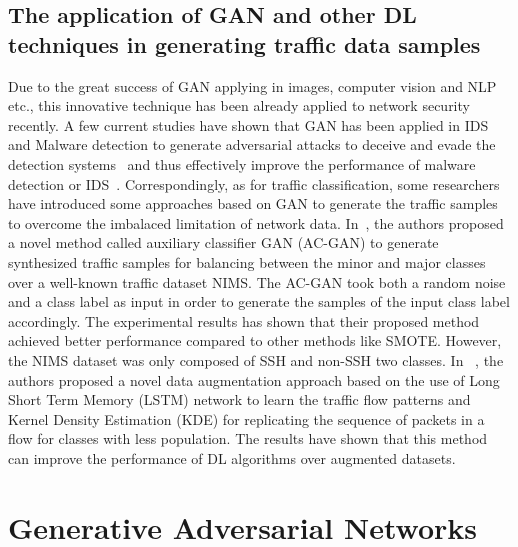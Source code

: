 \documentclass[conference]{IEEEtran}
\begin{document}
\subsection{The application of GAN and other DL techniques in generating traffic data samples}
Due to the great success of GAN applying in images, computer vision and NLP etc., this innovative technique has been already applied to network security recently. A few current studies have shown that GAN has been applied in IDS and Malware detection to generate adversarial attacks to deceive and evade the detection systems~\cite{Lin2018IDSGANGA,Hu2017GAN} and thus effectively improve the performance of malware detection or IDS~\cite{Hu2017GAN,KimGAN,Lin2018IDSGANGA,Salem2018GAN,Knife-Fight}. Correspondingly, as for traffic classification, some researchers have introduced some approaches based on GAN to generate the traffic samples to overcome the imbalaced limitation of network data. In~\cite{Vu-GAN}, the authors proposed a novel method called auxiliary classifier GAN (AC-GAN) to generate synthesized traffic samples for balancing between the minor and major classes over a well-known traffic dataset NIMS. The AC-GAN took both a random noise and a class label as input in order to generate the samples of the input class label accordingly. The experimental results has shown that their proposed method achieved better performance compared to other methods like SMOTE. However, the NIMS dataset was only composed of  SSH and non-SSH two classes. In ~\cite{Hasibi2019AugmentationSF}, the authors proposed a novel data augmentation approach based on the use of Long Short Term Memory (LSTM) network to learn the traffic flow patterns and Kernel Density Estimation (KDE) for replicating the sequence of packets in a flow for classes with less population. The results have shown that this method can improve the performance of DL algorithms over augmented datasets. 

\section{Generative Adversarial Networks}\label{gan}
\end{document}
